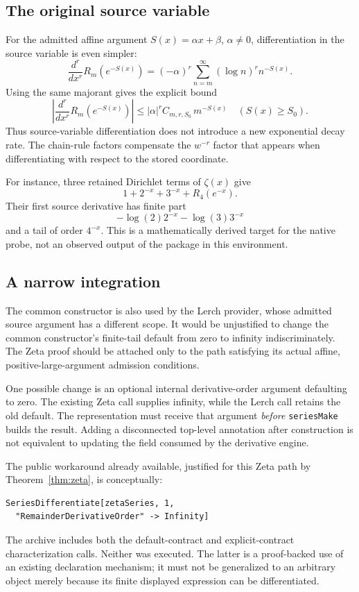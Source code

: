 \documentclass[11pt,a4paper]{article}
\newcommand{\code}[1]{\nolinkurl{#1}}
\begin{document}
\subsection{The original source variable}
For the admitted affine argument $S(x)=\alpha x+\beta$, $\alpha\ne0$, differentiation in the source variable is even simpler:
\[
 \frac{d^r}{dx^r}R_m(e^{-S(x)})
 =(-\alpha)^r\sum_{n=m}^{\infty}(\log n)^r n^{-S(x)}.
\]
Using the same majorant gives the explicit bound
\begin{equation}\label{eq:zeta-source-bound}
 \left|\frac{d^r}{dx^r}R_m(e^{-S(x)})\right|
 \leq |\alpha|^r C_{m,r,S_0}\,m^{-S(x)}
 \quad(S(x)\geq S_0).
\end{equation}
Thus source-variable differentiation does not introduce a new exponential decay rate. The chain-rule factors compensate the $w^{-r}$ factor that appears when differentiating with respect to the stored coordinate.

For instance, three retained Dirichlet terms of $\zeta(x)$ give
\[
 1+2^{-x}+3^{-x}+R_4(e^{-x}).
\]
Their first source derivative has finite part
\[
 -\log(2)2^{-x}-\log(3)3^{-x}
\]
and a tail of order $4^{-x}$. This is a mathematically derived target for the native probe, not an observed output of the package in this environment.

\subsection{A narrow integration}
The common constructor is also used by the Lerch provider, whose admitted source argument has a different scope. It would be unjustified to change the common constructor's finite-tail default from zero to infinity indiscriminately. The Zeta proof should be attached only to the path satisfying its actual affine, positive-large-argument admission conditions.

One possible change is an optional internal derivative-order argument defaulting to zero. The existing Zeta call supplies infinity, while the Lerch call retains the old default. The representation must receive that argument \emph{before} \code{seriesMake} builds the result. Adding a disconnected top-level annotation after construction is not equivalent to updating the field consumed by the derivative engine.

The public workaround already available, justified for this Zeta path by Theorem~\ref{thm:zeta}, is conceptually:
\begin{lstlisting}
SeriesDifferentiate[zetaSeries, 1,
  "RemainderDerivativeOrder" -> Infinity]
\end{lstlisting}
The archive includes both the default-contract and explicit-contract characterization calls. Neither was executed. The latter is a proof-backed use of an existing declaration mechanism; it must not be generalized to an arbitrary object merely because its finite displayed expression can be differentiated.
\end{document}

